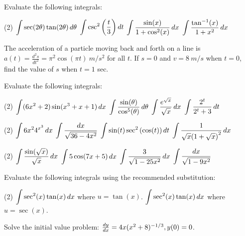 \documentclass[../mathNotesPreamble]{subfiles}
\begin{document}
  \begin{ex*}
    Evaluate the following integrals:
  \end{ex*}
  \begin{tasks}[after-item-skip=\stretch{1}](2)
    \task $\ds\int\sec(2\theta)\tan(2\theta)\,d\theta$
    \task $\ds\int\csc^2\parens{\frac{t}{3}}\,dt$
    \task $\ds\int \frac{\sin(x)}{1+\cos^2(x)}\,dx$
    \task $\ds\int \frac{\tan\inv(x)}{1+x^2}\,dx$
  \end{tasks}
  
  \noindent
  The acceleration of a particle moving back and forth on a line is $a(t)=\frac{d^2s}{dt^2}=\pi^2\cos(\pi t)\ m/s^2$ for all $t$. If $s=0$ and $v=8\ m/s$ when $t=0$, find the value of $s$ when $t=1$ sec.
  \pagebreak
  
  \begin{ex*}
    Evaluate the following integrals:
  \end{ex*}
  \begin{tasks}[after-item-skip=\stretch{1}](2)
    \task $\ds\int(6x^2+2)\sin(x^3+x+1)\,dx$
    \task $\ds\int \frac{\sin(\theta)}{\cos^5(\theta)}\,d\theta$
    \task $\ds\int \frac{e^{\sqrt{x}}}{\sqrt x}\,dx$
    \task $\ds\int \frac{2^t}{2^t+3}\,dt$
  \end{tasks}
  \pagebreak
  
  \begin{tasks}[after-item-skip=\stretch{1}, resume](2)
    \task $\ds\int 6x^2 4^{x^3}\,dx$
    \task $\ds\int \frac{dx}{\sqrt{36-4x^2}}$
    \task $\ds\int \sin(t)\sec^2\parens{\cos(t)}\,dt$
    \task $\ds\int \frac{1}{\sqrt{x}\parens{1+\sqrt{x}}^2}\,dx$
  \end{tasks}
  \pagebreak

  \begin{tasks}[after-item-skip=\stretch{1}, resume](2)
    \task $\ds\int \frac{\sin(\sqrt{x})}{\sqrt x}\,dx$
    \task $\ds\int 5\cos(7x+5)\,dx$
    \task $\ds\int \frac{3}{\sqrt{1-25x^2}}\,dx$
    \task $\ds\int \frac{dx}{\sqrt{1-9x^2}}$
  \end{tasks}
  \pagebreak

  \begin{ex*}
    Evaluate the following integrals using the recommended substitution:
  \end{ex*}
  \begin{tasks}(2)
    \task $\ds\int \sec^2(x)\tan(x)\,dx$ \newline where $u=\tan(x)$.
    \task $\ds\int \sec^2(x)\tan(x)\,dx$ \newline where $u=\sec(x)$.
  \end{tasks}
  \begin{ex*}
  Solve the initial value problem: $\frac{dy}{dx}=4x(x^2+8)\inv[1/3], y(0)=0$.
  \end{ex*}
  \pagebreak
\end{document}
